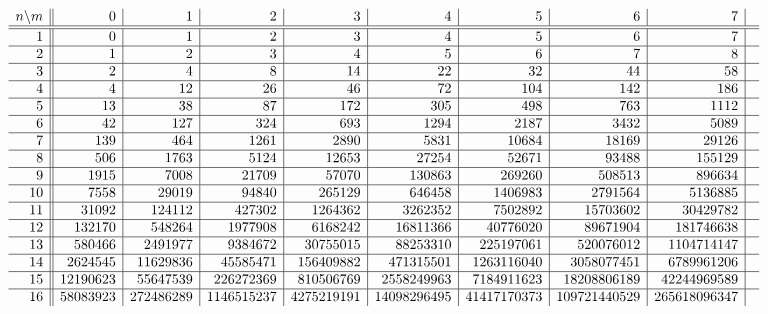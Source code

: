 \documentclass[preprint,authoryear]{elsarticle}
\begin{document}
\begin{landscape}
  \begin{figure}[tb]
    \begin{center}
      \begin{math}
        \begin{array}[h]{r || r | r | r | r | r | r| r| r| r}
          n\backslash m& 0& 1 & 2 & 3 & 4 & 5 & 6 &  7 & \\
          \hline \hline
          1 & 0 & 1 & 2 & 3 & 4 & 5 & 6 & 7\\
          \hline
          2 & 1&2 & 3 & 4 & 5 & 6 & 7 & 8 \\
          \hline
          3 & 2& 4 & 8  & 14 & 22 & 32 & 44 & 58   \\
          \hline
          4 & 4& 12 & 26 & 46 & 72 & 104 & 142 & 186 \\
          \hline
          5 & 13& 38 & 87 & 172 & 305 & 498 &  763 & 1112 \\
          \hline
          6 & 42 & 127 & 324&  693 &  1294  & 2187 & 3432 &5089\\
          \hline
          7 & 139& 464& 1261& 2890 & 5831& 10684&18169 &29126\\
          \hline
          8 & 506& 1763& 5124& 12653 & 27254 & 52671 & 93488 &155129\\
          \hline
          9 & 1915& 7008& 21709& 57070& 130863& 269260& 508513& 896634\\
          \hline
          10 &   7558& 29019& 94840& 265129& 646458& 1406983& 2791564& 5136885 \\
          \hline
          11 & 31092& 124112& 427302& 1264362& 3262352& 7502892& 15703602 &30429782\\
          \hline
          12 & 132170& 548264& 1977908& 6168242& 16811366& 40776020& 89671904& 181746638\\
          \hline
          13 & 580466& 2491977& 9384672& 30755015& 88253310& 225197061& 520076012& 1104714147\\
          \hline
          14 & 2624545 & 11629836 & 45585471 & 156409882 & 471315501 & 1263116040 &3058077451
          & 6789961206 \\
          \hline
          15 & 12190623 &  55647539 &  226272369 &  810506769 &  2558249963 & 
          7184911623 &  18208806189 &  42244969589 \\
          \hline
          16 & 58083923 &  272486289 &  1146515237 &  4275219191 &  14098296495 &  41417170373
          &109721440529 &  265618096347 \\

\end{array}
\end{math}
\end{center}
\end{figure}
\end{landscape}
\end{document}
